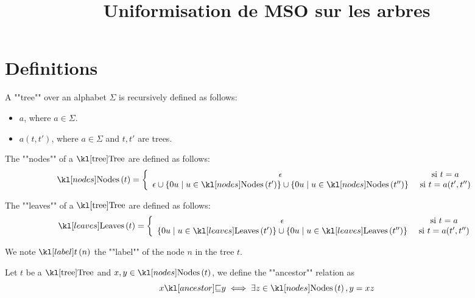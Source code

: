 \documentclass{article}
\begin{document}
\title{Uniformisation de MSO sur les arbres}

\maketitle

\section{Definitions}


\begin{definition}[Tree]
	A ""tree"" over an alphabet $\Sigma$ is recursively defined as follows:
	\begin{itemize}
		\item $a$, where $a \in \Sigma$.
		\item $a(t,t')$, where $a \in \Sigma$ and $t, t'$ are trees.
	\end{itemize}
\end{definition}

\begin{definition}[Nodes]
	The ""nodes"" of a $\tree$ are defined as follows:
	$$
		\nodes t = \left\{  \begin{array}{cc}
			\epsilon                                & \text{ si } t = a         \\
			\epsilon \cup \setdef {0u} {u \in \nodes {t'}}
			\cup \setdef {0u} {u \in \nodes {t''} } & \text{ si } t = a(t',t'')
		\end{array}
		\right.
	$$
\end{definition}


\begin{definition}[Leaves]
	The ""leaves"" of a $\tree$ are defined as follows:
	$$
		\leaves t = \left\{  \begin{array}{cc}
			\epsilon                                 & \text{ si } t = a         \\
			\setdef {0u} {u \in \leaves {t'}}
			\cup \setdef {0u} {u \in \leaves {t''} } & \text{ si } t = a(t',t'')
		\end{array}
		\right.
	$$
\end{definition}


\begin{notation}
	We note $\tlabel t n$ the ""label"" of the node $n$ in the tree $t$.
\end{notation}

\begin{definition}
	Let $t$ be a $\tree$ and $x, y \in \nodes t$, we define the ""ancestor"" relation as
	$$ \ancestor x y \iff \exists z \in \nodes t, y = xz$$
\end{definition}
\end{document}
